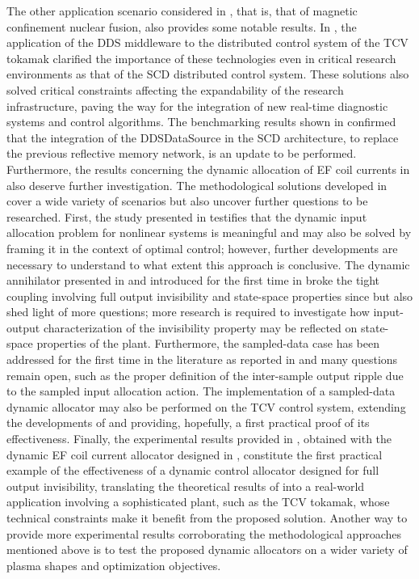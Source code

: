 The other application scenario considered in , that is, that of magnetic confinement nuclear fusion, also provides some notable results. In , the application of the DDS middleware to the distributed control system of the TCV tokamak clarified the importance of these technologies even in critical research environments as that of the SCD distributed control system. These solutions also solved critical constraints affecting the expandability of the research infrastructure, paving the way for the integration of new real-time diagnostic systems and control algorithms. The benchmarking results shown in  confirmed that the integration of the DDSDataSource in the SCD architecture, to replace the previous reflective memory network, is an update to be performed. Furthermore, the results concerning the dynamic allocation of EF coil currents in  also deserve further investigation. The methodological solutions developed in  cover a wide variety of scenarios but also uncover further questions to be researched. First, the study presented in  testifies that the dynamic input allocation problem for nonlinear systems is meaningful and may also be solved by framing it in the context of optimal control; however, further developments are necessary to understand to what extent this approach is conclusive. The dynamic annihilator presented in  and introduced for the first time in \cite{cristofaro_output_2014} broke the tight coupling involving full output invisibility and state-space properties since \cite{zaccarian_dynamic_2009} but also shed light of more questions; more research is required to investigate how input-output characterization of the invisibility property may be reflected on state-space properties of the plant. Furthermore, the sampled-data case has been addressed for the first time in the literature as reported in  and many questions remain open, such as the proper definition of the inter-sample output ripple due to the sampled input allocation action. The implementation of a sampled-data dynamic allocator may also be performed on the TCV control system, extending the developments of  and providing, hopefully, a first practical proof of its effectiveness. Finally, the experimental results provided in , obtained with the dynamic EF coil current allocator designed in , constitute the first practical example of the effectiveness of a dynamic control allocator designed for full output invisibility, translating the theoretical results of  into a real-world application involving a sophisticated plant, such as the TCV tokamak, whose technical constraints make it benefit from the proposed solution. Another way to provide more experimental results corroborating the methodological approaches mentioned above is to test the proposed dynamic allocators on a wider variety of plasma shapes and optimization objectives.
